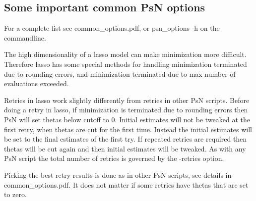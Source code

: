 \subsection{Some important common PsN options}
For a complete list see common\_options.pdf, 
or psn\_options -h on the commandline.

The high dimensionality of a lasso model can make minimization more difficult. Therefore lasso has some special methods for handling minimization terminated due to rounding errors, and minimization terminated due to max number of evaluations exceeded.

Retries in lasso work slightly differently from retries in other PsN scripts. Before doing a retry in lasso, if minimization is terminated due to rounding errors then PsN will set thetas below cutoff to 0. Initial estimates will not be tweaked at the first retry, when thetas are cut for the first time. Instead the initial estimates will be set to the final estimates of the first try. If repeated retries are required then thetas will be cut again and then initial estimates will be tweaked. As with any PsN script the total number of retries is governed by the -retries option. 

Picking the best retry results is done as in other PsN scripts, see details 
in common\_options.pdf. It does not matter if some retries have thetas that are set to zero.

